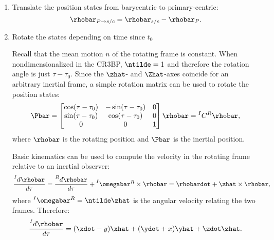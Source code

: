\begin{enumerate}
    \item   Translate the position states from barycentric to primary-centric:
            \begin{equation}
                \rhobar_{P\rightarrow s/c}=\rhobar_{s/c}-\rhobar_{P}.
                \label{eq:translation}
            \end{equation}
    \item   Rotate the states depending on time since $t_{0}$
    
            Recall that the mean motion $n$ of the rotating frame is constant. When
            nondimensionalized in the CR3BP, $\ntilde=1$ and therefore the rotation angle is just
            $\tau-\tau_{0}$. Since the $\zhat$- and $\Zhat$-axes coincide for an arbitrary inertial
            frame, a simple rotation matrix can be used to rotate the position states:
            \begin{equation}
                \Pbar=\begin{bmatrix}   \cos(\tau-\tau_{0}) &   -\sin(\tau-\tau_{0})    &   0   \\
                                        \sin(\tau-\tau_{0}) &   \cos(\tau-\tau_{0})     &   0   \\
                                        0                   &   0                       &   1   \end{bmatrix}\rhobar=\prescript{I}{}{C}^{R}\rhobar,
                \label{eq:positionrotation}
            \end{equation}
            where $\rhobar$ is the rotating position and $\Pbar$ is the inertial position.

            Basic kinematics can be used to compute the velocity in the rotating frame relative to
            an inertial observer:
            \begin{equation}
                \frac{\prescript{I}{}{d\rhobar}}{d\tau}=\frac{\prescript{R}{}{d\rhobar}}{d\tau}+\prescript{I}{}{\omegabar}^{R}\times\rhobar=\rhobardot+\zhat\times\rhobar,
                \label{eq:BKE}
            \end{equation}
            where $\prescript{I}{}{\omegabar}^{R}=\ntilde\zhat$ is the angular velocity relating
            the two frames. Therefore:
            \begin{equation}
                \frac{\prescript{I}{}{d\rhobar}}{d\tau}=(\xdot-y)\xhat+(\ydot+x)\yhat+\zdot\zhat.
                \label{eq:inertialrotatingvelocity}
            \end{equation}
            

\end{enumerate}
